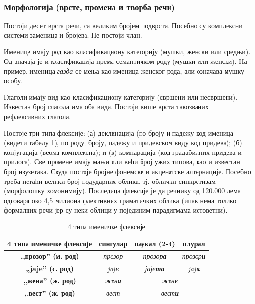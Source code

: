 {\begin{multicols}{2}
\subsubsection {Морфологија (врсте, промена и творба речи)}
  
Постоји десет врста речи, са великим бројем подврста. Посебно су комплексни системи заменица и бројева. Не постоји члан. 

Именице имају род као класификациону категорију (мушки, женски или средњи). Од значаја је и класификација према семантичком роду (мушки или женски). На пример, именица \textit{газда} се мења као именица женског рода, али означава мушку особу. 

Глаголи имају вид као класификациону категорију (свршени или  несвршени). Известан број глагола има оба вида. Постоји више врста такозваних рефлексивних глагола. 

Постоје три типа флексије: (а) деклинација (по броју и падежу код именица (видети табелу \ref{imenicke_fleksije}), по роду, броју, падежу и придевском виду код придева); (б) конјугација (веома комплексна); и (в) компарација (код градабилних придева и прилога).  Све промене имају мањи или већи број ужих типова, као и известан број изузетака. Свуда постоје бројне фонемске и акценатске алтернације. Посебно треба истаћи велики број подударних облика, тј. облички синкретизам (морфолошку хомонимију). Последица флексије је да речнику од 120.000 лема одговара око 4,5 милиона флективних граматичких облика (ипак нема толико формалних речи јер су неки облици у појединим парадигмама истоветни). 

\begin{table}[ht]
\begin{center}
\begin{tabular}{|c|c|c|c|}
\hline
{\textbf{4 типа именичке флексије}} & {\textbf{сингулар}} & {\textbf{паукал (2-4)}} & {\textbf{плурал}} \\
\hline
{\textbf{,,прозор'' (м. род)}} & \textit{прозор} & \textit{прозор\textbf{а}} & \textit{прозор\textbf{и}} \\
\hline
{\textbf{,,jaje'' (с. род)}} & \textit{jaj\textbf{e}} & \textit{јаје\textbf{та}} & \textit{jaj\textbf{a}} \\
\hline
{\textbf{,,жена'' (ж. род)}} & \textit{жен\textbf{а}} & \multicolumn{2}{c|}{\textit{жен\textbf{е}}} \\
\hline
{\textbf{,,вест'' (ж. род)}} & \textit{вест} &  \multicolumn{2}{c|}{\textit{вест\textbf{и}}} \\
\hline
\end{tabular}
\end{center}
\caption{4 типа именичке флексије}
\label{imenicke_fleksije}
\end{table}



\end{multicols}}

